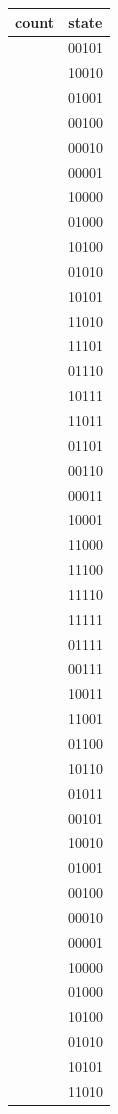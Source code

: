 \documentclass{article}
\begin{document}
\begin{center}
\begin{tabular}{c|c}
count & state \\ \hline
[56] & 00101 \\ \hline
[57] & 10010 \\ \hline
[58] & 01001 \\ \hline
[59] & 00100 \\ \hline
[60] & 00010 \\ \hline
[61] & 00001 \\ \hline
[62] & 10000 \\ \hline
[63] & 01000 \\ \hline
[64] & 10100 \\ \hline
[65] & 01010 \\ \hline
[66] & 10101 \\ \hline
[67] & 11010 \\ \hline
[68] & 11101 \\ \hline
[69] & 01110 \\ \hline
[70] & 10111 \\ \hline
[71] & 11011 \\ \hline
[72] & 01101 \\ \hline
[73] & 00110 \\ \hline
[74] & 00011 \\ \hline
[75] & 10001 \\ \hline
[76] & 11000 \\ \hline
[77] & 11100 \\ \hline
[78] & 11110 \\ \hline
[79] & 11111 \\ \hline
[80] & 01111 \\ \hline
[81] & 00111 \\ \hline
[82] & 10011 \\ \hline
[83] & 11001 \\ \hline
[84] & 01100 \\ \hline
[85] & 10110 \\ \hline
[86] & 01011 \\ \hline
[87] & 00101 \\ \hline
[88] & 10010 \\ \hline
[90] & 01001 \\ \hline
[91] & 00100 \\ \hline
[92] & 00010 \\ \hline
[93] & 00001 \\ \hline
[94] & 10000 \\ \hline
[95] & 01000 \\ \hline
[96] & 10100 \\ \hline
[97] & 01010 \\ \hline
[98] & 10101 \\ \hline
[99] & 11010 \\ \hline

\end{tabular}
\end{center}
\end{document}
